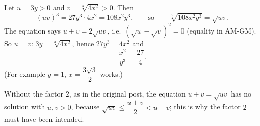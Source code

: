 Let $u=3y>0$ and $v=\sqrt[3]{4x^2}>0$. Then
\[
(uv)^3=27y^3\cdot4x^2=108x^2y^3,\qquad\text{so}\qquad\sqrt[6]{108x^2y^3}=\sqrt{uv}.
\]
The equation says $u+v=2\sqrt{uv}$, i.e.\ $\left(\sqrt u-\sqrt v\right)^2=0$ (equality in AM-GM). So $u=v$: $3y=\sqrt[3]{4x^2}$, hence $27y^3=4x^2$ and
\[
\dfrac{x^2}{y^3}=\boxed{\dfrac{27}{4}} .
\]
(For example $y=1$, $x=\dfrac{3\sqrt3}{2}$ works.)

Without the factor $2$, as in the original post, the equation $u+v=\sqrt{uv}$ has no solution with $u,v>0$, because $\sqrt{uv}\le\dfrac{u+v}{2}<u+v$; this is why the factor $2$ must have been intended.
